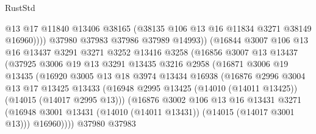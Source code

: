 \begin{lexlean}{RustStd}
\begin{coremodule}
                              @13
                              @17
                              @11840
                              @13406
                              @38165
                              (@38135 @106 @13 @16 @11834 @3271 @38149 @16960))))
                        @37980
                        @37983
                        @37986
                        @37989
                        @14993))
                    (@16844
                      @3007
                      @106
                      @13
                      @16
                      @13437
                      @3291
                      @3271
                      @3252
                      @13416
                      @3258
                      (@16856
                        @3007
                        @13
                        @13437
                        (@37925
                          @3006
                          @19
                          @13
                          @3291
                          @13435
                          @3216
                          @2958
                          (@16871
                            @3006
                            @19
                            @13435
                            (@16920
                              @3005
                              @13
                              @18
                              @3974
                              @13434
                              @16938
                              (@16876
                                @2996
                                @3004
                                @13
                                @17
                                @13425
                                @13433
                                (@16948
                                  @2995
                                  @13425
                                  (@14010 (@14011 @13425))
                                  (@14015 (@14017 @2995 @13)))
                                (@16876
                                  @3002
                                  @106
                                  @13
                                  @16
                                  @13431
                                  @3271
                                  (@16948
                                    @3001
                                    @13431
                                    (@14010 (@14011 @13431))
                                    (@14015 (@14017 @3001 @13)))
                                  @16960))))
                          @37980
                          @37983

\end{coremodule}
\end{lexlean}
